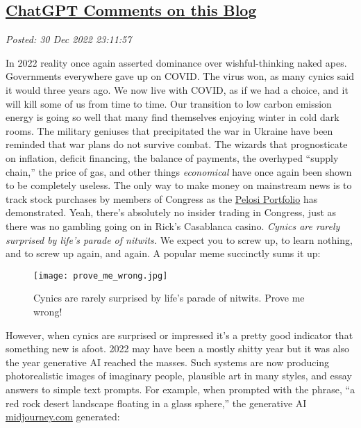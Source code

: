 %

\subsection*{\href{https://analyzethedatanotthedrivel.org/2022/12/30/chatgpt-comments-on-this-blog/}{ChatGPT Comments on this Blog}}


\noindent\emph{Posted: 30 Dec 2022 23:11:57}
\vspace{6pt}

In 2022 reality once again asserted dominance over wishful-thinking
naked apes. Governments everywhere gave up on COVID. The virus won, as
many cynics said it would three years ago. We now live with COVID, as if
we had a choice, and it will kill some of us from time to time. Our
transition to low carbon emission energy is going so well that many find
themselves enjoying winter in cold dark rooms. The military geniuses
that precipitated the war in Ukraine have been reminded that war plans
do not survive combat. The wizards that prognosticate on inflation,
deficit financing, the balance of payments, the overhyped ``supply
chain,'' the price of gas, and other things \emph{economical} have once
again been shown to be completely useless. The only way to make money on
mainstream news is to track stock purchases by members of Congress as
the
\href{https://www.investmentnews.com/pelosis-portfolio-performance-now-wrapped-in-an-etf-218304}{Pelosi
Portfolio} has demonstrated. Yeah, there's absolutely no insider trading
in Congress, just as there was no gambling going on in Rick's Casablanca
casino. \emph{Cynics are rarely surprised by life's parade of nitwits.} We
expect you to screw up, to learn nothing, and to screw up again, and
again. A popular meme succinctly sums it up:

\captionsetup[figure]{labelformat=empty}
\begin{figure}[htbp]
\centering
\texttt{[image: prove\_me\_wrong.jpg]}
\caption[Prove me wrong]{Cynics are rarely surprised by life's parade of nitwits. Prove me wrong!}
 \label{fig:7681x0}
\end{figure}

However, when cynics are surprised or impressed it's a pretty good
indicator that something new is afoot. 2022 may have been a mostly
shitty year but it was also the year generative AI reached the masses.
Such systems are now producing photorealistic images of imaginary
people, plausible art in many styles, and essay answers to simple text
prompts. For example, when prompted with the phrase, ``a red rock desert
landscape floating in a glass sphere,'' the generative AI
\href{https://midjourney.com}{midjourney.com} generated:

